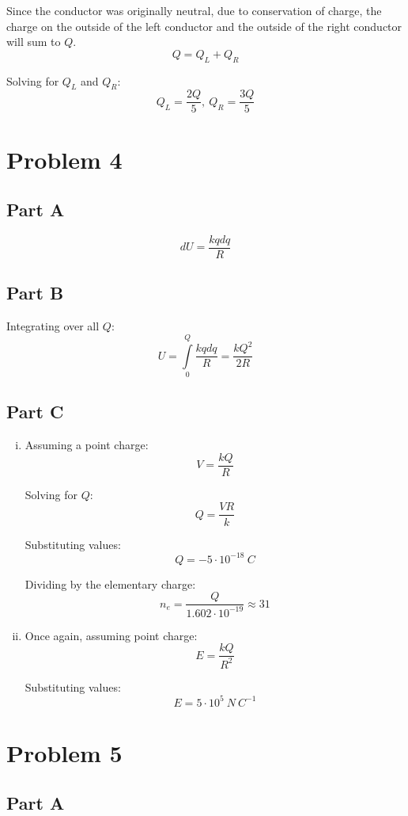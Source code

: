 \documentclass{article}
\begin{document}
\bigbreak

Since the conductor was originally neutral, due to conservation of charge, the
charge on the outside of the left conductor and the outside of the right
conductor will sum to $Q$.
$$ Q = Q_{L} + Q_{R} $$

Solving for $Q_{L}$ and $Q_{R}$:
$$ Q_{L} = \frac{ 2 Q }{ 5 },\ Q_{R} = \frac{ 3 Q }{ 5 } $$

\section*{Problem 4}

\subsection*{Part A}

$$ dU = \frac{ k q dq }{ R } $$

\subsection*{Part B}

Integrating over all $Q$:
$$ U = \int\limits_{0}^{Q} \frac{ k q dq }{ R } = \frac{ k Q^{2} }{ 2R }$$

\subsection*{Part C}

\begin{enumerate}[i.]
  \item Assuming a point charge:
    $$ V = \frac{ k Q }{ R } $$

    Solving for $Q$:
    $$ Q = \frac{ V R }{ k } $$

    Substituting values:
    $$ Q = -5 \cdot 10^{-18}\ \si{C} $$

    Dividing by the elementary charge:
    $$ n_{e} = \frac{ Q }{ 1.602 \cdot 10^{-19} }\approx 31 $$
  \item Once again, assuming point charge:
    $$ E = \frac{ k Q }{ R^{2} } $$

    Substituting values:
    $$ E = 5 \cdot 10^{5}\ \si{N\ C^{-1}} $$
\end{enumerate}

\section*{Problem 5}

\subsection*{Part A}
\end{document}
